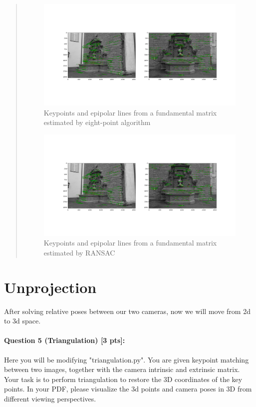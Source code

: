 \documentclass[11pt]{article}
\begin{document}
\begin{quote}
\begin{figure}[h]
    \centering
    \includegraphics[width=1.0\linewidth]{epipolar_lines_8pts.png}
    \caption{Keypoints and epipolar lines from a fundamental matrix estimated by eight-point algorithm}
    \label{fig:epipolar_lines_8pts}
\end{figure}

\begin{figure}[h]
    \centering
    \includegraphics[width=1.0\linewidth]{epipolar_lines_ransac.png}
    \caption{Keypoints and epipolar lines from a fundamental matrix estimated by RANSAC}
    \label{fig:epipolar_lines_ransac}
\end{figure}


\end{quote}

\section*{Unprojection} 
After solving relative poses between our two cameras, now we will move from 2d to 3d space.

\paragraph{Question 5 (Triangulation) [3 pts]:}
Here you will be modifying "triangulation.py". You are given keypoint matching between two images, together with the camera intrinsic and extrinsic matrix. Your task is to perform triangulation to restore the 3D coordinates of the key points. In your PDF, please visualize the 3d points and camera poses in 3D from different viewing perspectives. 
\end{document}

